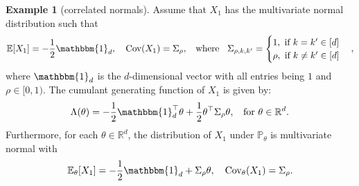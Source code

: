 \documentclass[aap,preprint]{imsart}
\newcommand{\Pro}{{\mathbb{P}}}
\newcommand{\Exp}{{\mathbb{E}}}
\newcommand{\bR}{{\mathbb{R}}}
\theoremstyle{plain}
\theoremstyle{definition}
\newtheorem{example}{Example}
\begin{document}
\begin{example}[correlated normals]\label{ex:cor_normal_siegmund}
Assume that $X_1$ has the multivariate normal distribution such that 
\begin{align}
    \label{def:cor_normal}
\Exp[X_1] = -\frac{1}{2}\mathbbm{1}_d, \quad
\text{Cov}(X_1) = \Sigma_{\rho}, \;\;\text{ where }\;\; \Sigma_{\rho,k,k'} = \begin{cases}
1, \text{ if } k = k' \in [d]\\
\rho,  \text{ if } k \neq k' \in [d]
\end{cases},
\end{align}
where $\mathbbm{1}_d$ is the $d$-dimensional vector with all entries being $1$ and $\rho \in [0,1)$.  The cumulant generating function of $X_1$ is given by: 
\begin{equation}
    \label{example:cor_normal_Lambda}
\Lambda(\theta) = -\frac{1}{2}\mathbbm{1}_d^{\top} \theta + \frac{1}{2}\theta^{\top} \Sigma_{\rho} \theta, \;\; \text{ for } \theta \in \bR^d.
\end{equation}
Furthermore, for each $\theta \in \mathbb{R}^d$, the distribution of $X_1$ under $\Pro_{\theta}$ is multivariate normal with
\begin{align*}
    \Exp_{\theta}[X_1] = - \frac{1}{2} \mathbbm{1}_d + \Sigma_\rho \theta, \quad
    \text{Cov}_{\theta}(X_1) = \Sigma_\rho.
\end{align*}




\end{example}
\end{document}
